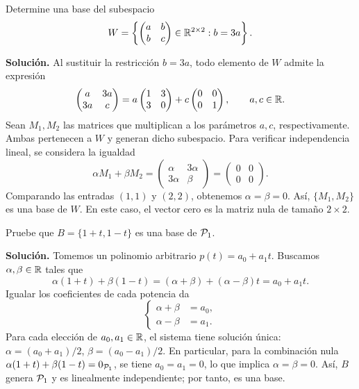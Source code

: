 \documentclass[compacto,10pt]{pubciencias-notas}
\begin{document}
\begin{ejem}\label{sem10cl01:matrices}
    Determine una base del subespacio
    \[
        W=\left\{\begin{pmatrix}a&b\\b&c\end{pmatrix}
            \in\Mat[\R]{2}{2}:b=3a\right\}.
    \]

    \textbf{Solución.} Al sustituir la restricción $b=3a$, todo elemento
    de $W$ admite la expresión
    \[
        \begin{pmatrix}a&3a\\3a&c\end{pmatrix}
        =a\begin{pmatrix}1&3\\3&0\end{pmatrix}
        +c\begin{pmatrix}0&0\\0&1\end{pmatrix},\qquad a,c\in\R.
    \]
    Sean $M_1,M_2$ las matrices que multiplican a los parámetros $a,c$,
    respectivamente. Ambas pertenecen a $W$ y generan dicho subespacio.
    Para verificar independencia lineal, se considera la igualdad
    \[
        \alpha M_1+\beta M_2=
        \begin{pmatrix}\alpha&3\alpha\\3\alpha&\beta\end{pmatrix}
        =\begin{pmatrix}0&0\\0&0\end{pmatrix}.
    \]
    Comparando las entradas $(1,1)$ y $(2,2)$, obtenemos
    $\alpha=\beta=0$. Así, $\{M_1,M_2\}$ es una base de $W$.
    En este caso, el vector cero es la matriz nula de tamaño $2\times2$.
\end{ejem}

\begin{ejem}\label{sem10cl01:polinomios}
    Pruebe que $B=\{1+t,1-t\}$ es una base de $\Pol_1$.

    \textbf{Solución.} Tomemos un polinomio arbitrario $p(t)=a_0+a_1t$.
    Buscamos $\alpha,\beta\in\R$ tales que
    \[
        \alpha(1+t)+\beta(1-t)
        =(\alpha+\beta)+(\alpha-\beta)t=a_0+a_1t.
    \]
    Igualar los coeficientes de cada potencia da
    \[
        \left\{\begin{aligned}\alpha+\beta&=a_0,\\\alpha-\beta&=a_1.\end{aligned}\right.
    \]
    Para cada elección de $a_0,a_1\in\R$, el sistema tiene solución única:
    $\alpha=(a_0+a_1)/2$, $\beta=(a_0-a_1)/2$. En particular, para
    la combinación nula $\alpha(1+t)+\beta(1-t)=0_{\Pol_1}$,
    se tiene $a_0=a_1=0$, lo que implica $\alpha=\beta=0$.
    Así, $B$ genera $\Pol_1$ y es linealmente independiente; por tanto,
    es una base.
\end{ejem}
\end{document}
